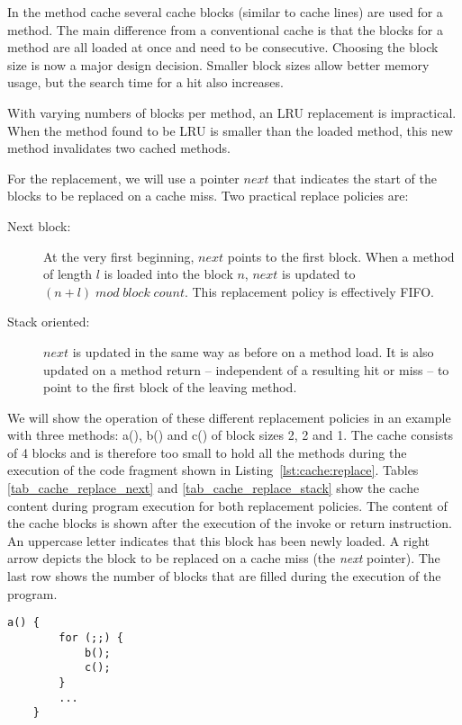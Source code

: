 In the method cache several cache blocks (similar to cache lines) are
used for a method. The main difference from a conventional cache is
that the blocks for a method are all loaded at once and need to be
consecutive. Choosing the block size is now a major design decision.
Smaller block sizes allow better memory usage, but the search time
for a hit also increases.

With varying numbers of blocks per method, an LRU replacement is
impractical. When the method found to be LRU is smaller than the
loaded method, this new method invalidates two cached methods.

For the replacement, we will use a pointer $next$ that indicates the
start of the blocks to be replaced on a cache miss. Two practical
replace policies are:
%
\begin{description}
\item [Next block:]At the very first beginning, $next$ points to
    the first block. When a method of length $l$ is loaded into
    the block $n$, $next$ is updated to
    $(n+l)\;mod\;block\;count$. This replacement policy is
    effectively FIFO.
\item [Stack oriented:]$next$ is updated in the same way as before
on a method load. It is also updated on a method return --
independent of a resulting hit or miss -- to point to the first
block of the leaving method.
\end{description}
%
We will show the operation of these different replacement policies in
an example with three methods: a(), b() and c() of block sizes 2, 2
and 1. The cache consists of 4 blocks and is therefore too small to
hold all the methods during the execution of the code fragment shown
in Listing~\ref{lst:cache:replace}. Tables
\ref{tab_cache_replace_next} and \ref{tab_cache_replace_stack} show
the cache content during program execution for both replacement
policies. The content of the cache blocks is shown after the
execution of the invoke or return instruction. An uppercase letter
indicates that this block has been newly loaded. A right arrow
depicts the block to be replaced on a cache miss (the \emph{next}
pointer). The last row shows the number of blocks that are filled
during the execution of the program.

%
\begin{samepage}
\begin{lstlisting}[float,caption={Code fragment for the replacement example},
label=lst:cache:replace]
    a() {
        for (;;) {
            b();
            c();
        }
        ...
    }
\end{lstlisting}
\end{samepage}
%

